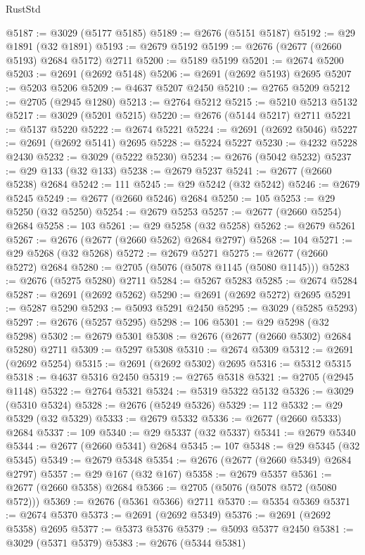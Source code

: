 \begin{lexlean}{RustStd}
\begin{coremodule}
@5187 := @3029 (@5177 @5185)
@5189 := @2676 (@5151 @5187)
@5192 := @29 @1891 (@32 @1891)
@5193 := @2679 @5192
@5199 := @2676 (@2677 (@2660 @5193) @2684 @5172) @2711
@5200 := @5189 @5199
@5201 := @2674 @5200
@5203 := @2691 (@2692 @5148)
@5206 := @2691 (@2692 @5193) @2695
@5207 := @5203 @5206
@5209 := @4637 @5207 @2450
@5210 := @2765 @5209
@5212 := @2705 (@2945 @1280)
@5213 := @2764 @5212
@5215 := @5210 @5213 @5132
@5217 := @3029 (@5201 @5215)
@5220 := @2676 (@5144 @5217) @2711
@5221 := @5137 @5220
@5222 := @2674 @5221
@5224 := @2691 (@2692 @5046)
@5227 := @2691 (@2692 @5141) @2695
@5228 := @5224 @5227
@5230 := @4232 @5228 @2430
@5232 := @3029 (@5222 @5230)
@5234 := @2676 (@5042 @5232)
@5237 := @29 @133 (@32 @133)
@5238 := @2679 @5237
@5241 := @2677 (@2660 @5238) @2684
@5242 := 111
@5245 := @29 @5242 (@32 @5242)
@5246 := @2679 @5245
@5249 := @2677 (@2660 @5246) @2684
@5250 := 105
@5253 := @29 @5250 (@32 @5250)
@5254 := @2679 @5253
@5257 := @2677 (@2660 @5254) @2684
@5258 := 103
@5261 := @29 @5258 (@32 @5258)
@5262 := @2679 @5261
@5267 := @2676 (@2677 (@2660 @5262) @2684 @2797)
@5268 := 104
@5271 := @29 @5268 (@32 @5268)
@5272 := @2679 @5271
@5275 := @2677 (@2660 @5272) @2684
@5280 := @2705 (@5076 (@5078 @1145 (@5080 @1145)))
@5283 := @2676 (@5275 @5280) @2711
@5284 := @5267 @5283
@5285 := @2674 @5284
@5287 := @2691 (@2692 @5262)
@5290 := @2691 (@2692 @5272) @2695
@5291 := @5287 @5290
@5293 := @5093 @5291 @2450
@5295 := @3029 (@5285 @5293)
@5297 := @2676 (@5257 @5295)
@5298 := 106
@5301 := @29 @5298 (@32 @5298)
@5302 := @2679 @5301
@5308 := @2676 (@2677 (@2660 @5302) @2684 @5280) @2711
@5309 := @5297 @5308
@5310 := @2674 @5309
@5312 := @2691 (@2692 @5254)
@5315 := @2691 (@2692 @5302) @2695
@5316 := @5312 @5315
@5318 := @4637 @5316 @2450
@5319 := @2765 @5318
@5321 := @2705 (@2945 @1148)
@5322 := @2764 @5321
@5324 := @5319 @5322 @5132
@5326 := @3029 (@5310 @5324)
@5328 := @2676 (@5249 @5326)
@5329 := 112
@5332 := @29 @5329 (@32 @5329)
@5333 := @2679 @5332
@5336 := @2677 (@2660 @5333) @2684
@5337 := 109
@5340 := @29 @5337 (@32 @5337)
@5341 := @2679 @5340
@5344 := @2677 (@2660 @5341) @2684
@5345 := 107
@5348 := @29 @5345 (@32 @5345)
@5349 := @2679 @5348
@5354 := @2676 (@2677 (@2660 @5349) @2684 @2797)
@5357 := @29 @167 (@32 @167)
@5358 := @2679 @5357
@5361 := @2677 (@2660 @5358) @2684
@5366 := @2705 (@5076 (@5078 @572 (@5080 @572)))
@5369 := @2676 (@5361 @5366) @2711
@5370 := @5354 @5369
@5371 := @2674 @5370
@5373 := @2691 (@2692 @5349)
@5376 := @2691 (@2692 @5358) @2695
@5377 := @5373 @5376
@5379 := @5093 @5377 @2450
@5381 := @3029 (@5371 @5379)
@5383 := @2676 (@5344 @5381)

\end{coremodule}
\end{lexlean}
